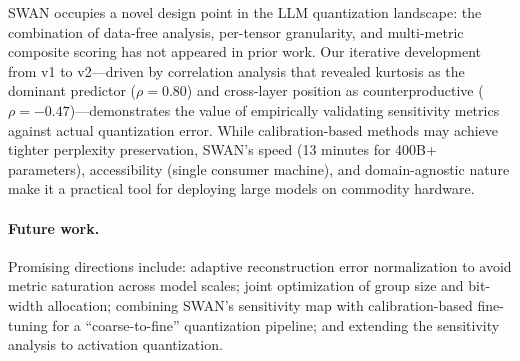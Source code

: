 \documentclass{article}
\begin{document}
SWAN occupies a novel design point in the LLM quantization landscape: the combination of data-free analysis, per-tensor granularity, and multi-metric composite scoring has not appeared in prior work. Our iterative development from v1 to v2---driven by correlation analysis that revealed kurtosis as the dominant predictor ($\rho = 0.80$) and cross-layer position as counterproductive ($\rho = -0.47$)---demonstrates the value of empirically validating sensitivity metrics against actual quantization error. While calibration-based methods may achieve tighter perplexity preservation, SWAN's speed (13 minutes for 400B+ parameters), accessibility (single consumer machine), and domain-agnostic nature make it a practical tool for deploying large models on commodity hardware.

\paragraph{Future work.}
Promising directions include: adaptive reconstruction error normalization to avoid metric saturation across model scales; joint optimization of group size and bit-width allocation; combining SWAN's sensitivity map with calibration-based fine-tuning for a ``coarse-to-fine'' quantization pipeline; and extending the sensitivity analysis to activation quantization.



\end{document}
